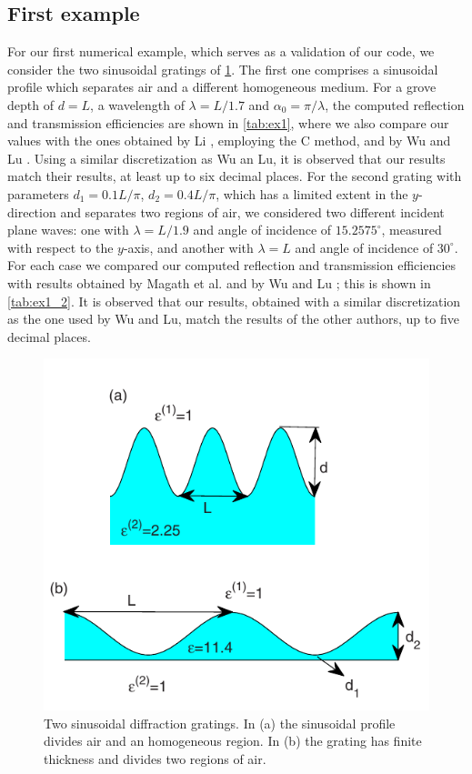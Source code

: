 \documentclass[reprint,amsmath,amssymb,
 aps]{revtex4-2}
\begin{document}
\subsection{First example}
For our first numerical example, which serves as a validation of our code, we consider the two sinusoidal gratings of \cref{fig:ex1}. The first one comprises a sinusoidal profile which separates air and a different homogeneous medium. For a grove depth of $d=L$, a wavelength of $\lambda=L/1.7$ and $\alpha_0 = \pi/\lambda$, the computed reflection and transmission efficiencies are shown in \cref{tab:ex1}, where we also compare our values with the ones obtained by Li \cite{li1993multilayer}, employing the C method, and by Wu and Lu \cite{wu2009analyzing}. Using a similar discretization as Wu an Lu, it is observed that our results match their results, at least up to six decimal places. For the second grating with parameters $d_1 = 0.1L/\pi$, $d_2 = 0.4L/\pi$, which has a limited extent in the $y$-direction and separates two regions of air, we considered two different incident plane waves: one with $\lambda = L/1.9$ and angle of incidence of $15.2575^\circ$, measured with respect to the $y$-axis, and another with $\lambda = L$ and angle of incidence of $30^\circ$. For each case we compared our computed reflection and transmission efficiencies with results obtained by Magath et al. \cite{magath2005fast} and by Wu and Lu \cite{wu2009analyzing}; this is shown in \cref{tab:ex1_2}. It is observed that our results, obtained with a similar discretization as the one used by Wu and Lu, match the results of the other authors, up to five decimal places. 

\begin{figure}[h!]
\includegraphics[width=0.6\columnwidth]{figures/ex1.png}
\caption{Two sinusoidal diffraction gratings. In (a) the sinusoidal profile divides air and an homogeneous region. In (b) the grating has finite thickness and divides two regions of air.}
\label{fig:ex1}
\end{figure}
\end{document}
